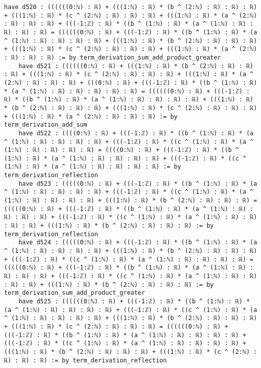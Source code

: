 \documentclass{article}
\begin{document}
\begin{tcolorbox}[colback=white!10, width=\linewidth]
\begin{lstlisting}[language=Lean4]
    have d520 : ((((((0:ℕ) : ℝ) + (((1:ℕ) : ℝ) * (b ^ (2:ℕ) : ℝ) : ℝ) : ℝ) + (((1:ℕ) : ℝ) * (c ^ (2:ℕ) : ℝ) : ℝ) : ℝ) + (((1:ℕ) : ℝ) * (a ^ (2:ℕ) : ℝ) : ℝ) : ℝ) + (((-1:ℤ) : ℝ) * ((b ^ (1:ℕ) : ℝ) * (a ^ (1:ℕ) : ℝ) : ℝ) : ℝ) : ℝ) = ((((((0:ℕ) : ℝ) + (((-1:ℤ) : ℝ) * ((b ^ (1:ℕ) : ℝ) * (a ^ (1:ℕ) : ℝ) : ℝ) : ℝ) : ℝ) + (((1:ℕ) : ℝ) * (b ^ (2:ℕ) : ℝ) : ℝ) : ℝ) + (((1:ℕ) : ℝ) * (c ^ (2:ℕ) : ℝ) : ℝ) : ℝ) + (((1:ℕ) : ℝ) * (a ^ (2:ℕ) : ℝ) : ℝ) : ℝ) := by term_derivation_sum_add_product_greater
    have d521 : ((((((0:ℕ) : ℝ) + (((1:ℕ) : ℝ) * (b ^ (2:ℕ) : ℝ) : ℝ) : ℝ) + (((1:ℕ) : ℝ) * (c ^ (2:ℕ) : ℝ) : ℝ) : ℝ) + (((1:ℕ) : ℝ) * (a ^ (2:ℕ) : ℝ) : ℝ) : ℝ) + (((0:ℕ) : ℝ) + (((-1:ℤ) : ℝ) * ((b ^ (1:ℕ) : ℝ) * (a ^ (1:ℕ) : ℝ) : ℝ) : ℝ) : ℝ) : ℝ) = ((((((0:ℕ) : ℝ) + (((-1:ℤ) : ℝ) * ((b ^ (1:ℕ) : ℝ) * (a ^ (1:ℕ) : ℝ) : ℝ) : ℝ) : ℝ) + (((1:ℕ) : ℝ) * (b ^ (2:ℕ) : ℝ) : ℝ) : ℝ) + (((1:ℕ) : ℝ) * (c ^ (2:ℕ) : ℝ) : ℝ) : ℝ) + (((1:ℕ) : ℝ) * (a ^ (2:ℕ) : ℝ) : ℝ) : ℝ) := by term_derivation_add_sum
    have d522 : ((((0:ℕ) : ℝ) + (((-1:ℤ) : ℝ) * ((b ^ (1:ℕ) : ℝ) * (a ^ (1:ℕ) : ℝ) : ℝ) : ℝ) : ℝ) + (((-1:ℤ) : ℝ) * ((c ^ (1:ℕ) : ℝ) * (a ^ (1:ℕ) : ℝ) : ℝ) : ℝ) : ℝ) = ((((0:ℕ) : ℝ) + (((-1:ℤ) : ℝ) * ((b ^ (1:ℕ) : ℝ) * (a ^ (1:ℕ) : ℝ) : ℝ) : ℝ) : ℝ) + (((-1:ℤ) : ℝ) * ((c ^ (1:ℕ) : ℝ) * (a ^ (1:ℕ) : ℝ) : ℝ) : ℝ) : ℝ) := by term_derivation_reflection
    have d523 : (((((0:ℕ) : ℝ) + (((-1:ℤ) : ℝ) * ((b ^ (1:ℕ) : ℝ) * (a ^ (1:ℕ) : ℝ) : ℝ) : ℝ) : ℝ) + (((-1:ℤ) : ℝ) * ((c ^ (1:ℕ) : ℝ) * (a ^ (1:ℕ) : ℝ) : ℝ) : ℝ) : ℝ) + (((1:ℕ) : ℝ) * (b ^ (2:ℕ) : ℝ) : ℝ) : ℝ) = (((((0:ℕ) : ℝ) + (((-1:ℤ) : ℝ) * ((b ^ (1:ℕ) : ℝ) * (a ^ (1:ℕ) : ℝ) : ℝ) : ℝ) : ℝ) + (((-1:ℤ) : ℝ) * ((c ^ (1:ℕ) : ℝ) * (a ^ (1:ℕ) : ℝ) : ℝ) : ℝ) : ℝ) + (((1:ℕ) : ℝ) * (b ^ (2:ℕ) : ℝ) : ℝ) : ℝ) := by term_derivation_reflection
    have d524 : (((((0:ℕ) : ℝ) + (((-1:ℤ) : ℝ) * ((b ^ (1:ℕ) : ℝ) * (a ^ (1:ℕ) : ℝ) : ℝ) : ℝ) : ℝ) + (((1:ℕ) : ℝ) * (b ^ (2:ℕ) : ℝ) : ℝ) : ℝ) + (((-1:ℤ) : ℝ) * ((c ^ (1:ℕ) : ℝ) * (a ^ (1:ℕ) : ℝ) : ℝ) : ℝ) : ℝ) = (((((0:ℕ) : ℝ) + (((-1:ℤ) : ℝ) * ((b ^ (1:ℕ) : ℝ) * (a ^ (1:ℕ) : ℝ) : ℝ) : ℝ) : ℝ) + (((-1:ℤ) : ℝ) * ((c ^ (1:ℕ) : ℝ) * (a ^ (1:ℕ) : ℝ) : ℝ) : ℝ) : ℝ) + (((1:ℕ) : ℝ) * (b ^ (2:ℕ) : ℝ) : ℝ) : ℝ) := by term_derivation_sum_add_product_greater
    have d525 : ((((((0:ℕ) : ℝ) + (((-1:ℤ) : ℝ) * ((b ^ (1:ℕ) : ℝ) * (a ^ (1:ℕ) : ℝ) : ℝ) : ℝ) : ℝ) + (((-1:ℤ) : ℝ) * ((c ^ (1:ℕ) : ℝ) * (a ^ (1:ℕ) : ℝ) : ℝ) : ℝ) : ℝ) + (((1:ℕ) : ℝ) * (b ^ (2:ℕ) : ℝ) : ℝ) : ℝ) + (((1:ℕ) : ℝ) * (c ^ (2:ℕ) : ℝ) : ℝ) : ℝ) = ((((((0:ℕ) : ℝ) + (((-1:ℤ) : ℝ) * ((b ^ (1:ℕ) : ℝ) * (a ^ (1:ℕ) : ℝ) : ℝ) : ℝ) : ℝ) + (((-1:ℤ) : ℝ) * ((c ^ (1:ℕ) : ℝ) * (a ^ (1:ℕ) : ℝ) : ℝ) : ℝ) : ℝ) + (((1:ℕ) : ℝ) * (b ^ (2:ℕ) : ℝ) : ℝ) : ℝ) + (((1:ℕ) : ℝ) * (c ^ (2:ℕ) : ℝ) : ℝ) : ℝ) := by term_derivation_reflection

\end{lstlisting}
\end{tcolorbox}
\end{document}

